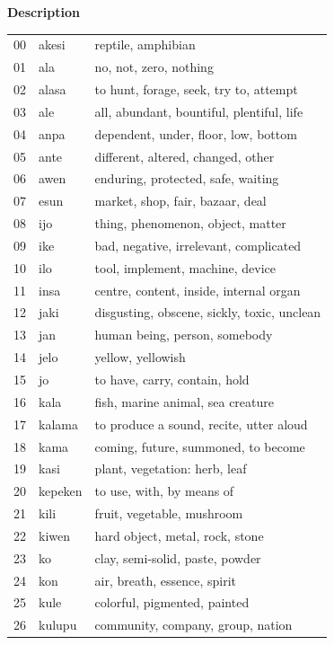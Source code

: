 \documentclass[11pt]{article}
\begin{document}
{\begin{center}
\textbf{Description}
\end{center}
\tiny
\begin{multicols}{2}[]
\begin{center}
\begin{tabularx}{\linewidth}{rlX}
00 & akesi & reptile, amphibian\\
01 & ala & no, not, zero, nothing\\
02 & alasa & to hunt, forage, seek, try to, attempt\\
03 & ale & all, abundant, bountiful, plentiful, life\\
04 & anpa & dependent, under, floor, low, bottom\\
05 & ante & different, altered, changed, other\\
06 & awen & enduring, protected, safe, waiting\\
07 & esun & market, shop, fair, bazaar, deal\\
08 & ijo & thing, phenomenon, object, matter\\
09 & ike & bad, negative, irrelevant, complicated\\
10 & ilo & tool, implement, machine, device\\
11 & insa & centre, content, inside, internal organ\\
12 & jaki & disgusting, obscene, sickly, toxic, unclean\\
13 & jan & human being, person, somebody\\
14 & jelo & yellow, yellowish\\
15 & jo & to have, carry, contain, hold\\
16 & kala & fish, marine animal, sea creature\\
17 & kalama & to produce a sound, recite, utter aloud\\
18 & kama & coming, future, summoned, to become\\
19 & kasi & plant, vegetation: herb, leaf\\
20 & kepeken & to use, with, by means of\\
21 & kili & fruit, vegetable, mushroom\\
22 & kiwen & hard object, metal, rock, stone\\
23 & ko & clay, semi-solid, paste, powder\\
24 & kon & air, breath, essence, spirit\\
25 & kule & colorful, pigmented, painted\\
26 & kulupu & community, company, group, nation\\

\end{tabularx}
\end{center}
\end{multicols}}
\end{document}
